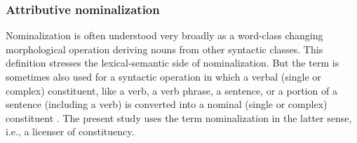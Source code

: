\subsubsection{Attributive nominalization}
\label{attr nmlz}
Nominalization is often understood very broadly as a word-class changing morphological operation deriving nouns from other syntactic classes. This definition stresses the lexical-semantic side of nominalization. But the term is sometimes also used for a syntactic operation in which a verbal (single or complex) constituent, like a verb, a verb phrase, a sentence, or a portion of a sentence (including a verb) is converted into a nominal (single or complex) constituent \citep[575]{li-etal1981}. The present study uses the term nominalization in the latter sense, i.e., a licenser of constituency.

